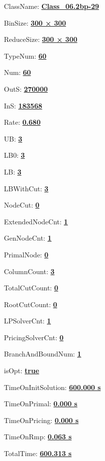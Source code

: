 \documentclass[11pt]{article}
\begin{document}
\pagestyle{empty}


ClassName: \underline{\textbf{Class_06.2bp-29}}
\par
BinSize: \underline{\textbf{300 × 300}}
\par
ReduceSize: \underline{\textbf{300 × 300}}
\par
TypeNum: \underline{\textbf{60}}
\par
Num: \underline{\textbf{60}}
\par
OutS: \underline{\textbf{270000}}
\par
InS: \underline{\textbf{183568}}
\par
Rate: \underline{\textbf{0.680}}
\par
UB: \underline{\textbf{3}}
\par
LB0: \underline{\textbf{3}}
\par
LB: \underline{\textbf{3}}
\par
LBWithCut: \underline{\textbf{3}}
\par
NodeCut: \underline{\textbf{0}}
\par
ExtendedNodeCnt: \underline{\textbf{1}}
\par
GenNodeCnt: \underline{\textbf{1}}
\par
PrimalNode: \underline{\textbf{0}}
\par
ColumnCount: \underline{\textbf{3}}
\par
TotalCutCount: \underline{\textbf{0}}
\par
RootCutCount: \underline{\textbf{0}}
\par
LPSolverCnt: \underline{\textbf{1}}
\par
PricingSolverCnt: \underline{\textbf{0}}
\par
BranchAndBoundNum: \underline{\textbf{1}}
\par
isOpt: \underline{\textbf{true}}
\par
TimeOnInitSolution: \underline{\textbf{600.000 s}}
\par
TimeOnPrimal: \underline{\textbf{0.000 s}}
\par
TimeOnPricing: \underline{\textbf{0.000 s}}
\par
TimeOnRmp: \underline{\textbf{0.063 s}}
\par
TotalTime: \underline{\textbf{600.313 s}}
\par
\newpage
\end{document}
